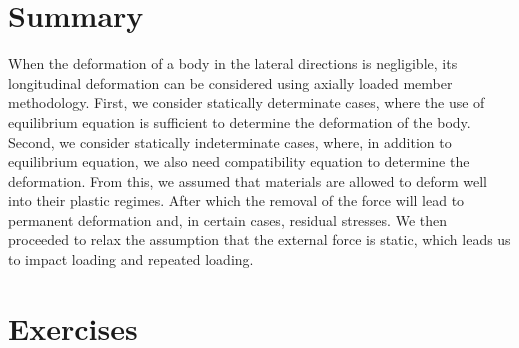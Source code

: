 \documentclass[
10pt,
a4paper,
openany,
svgnames,
]{kaobook} %
\begin{document}
\section*{Summary}

When the deformation of a body in the lateral directions is negligible, its longitudinal deformation can be considered using axially loaded member methodology. First, we consider statically determinate cases, where the use of equilibrium equation is sufficient to determine the deformation of the body. Second, we consider statically indeterminate cases, where, in addition to equilibrium equation, we also need compatibility equation to determine the deformation. From this, we assumed that materials are allowed to deform well into their plastic regimes. After which the removal of the force will lead to permanent deformation and, in certain cases, residual stresses. We then proceeded to relax the assumption that the external force is static, which leads us to impact loading and repeated loading.

\section*{Exercises}
\end{document}

